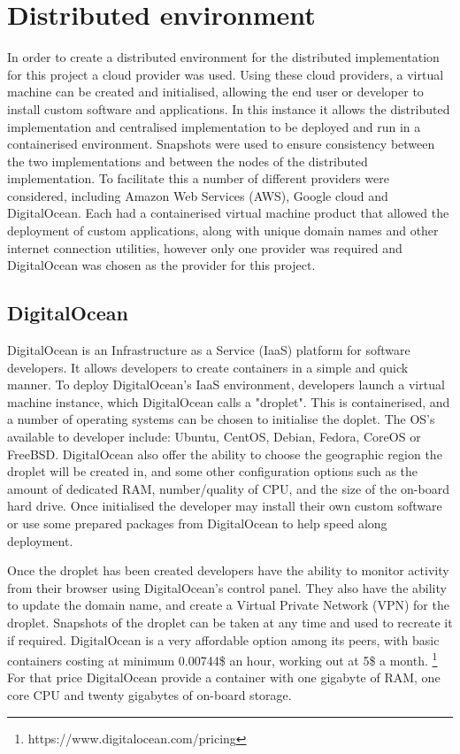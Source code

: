 \documentclass[oneside,12pt]{book}
\begin{document}
\section{Distributed environment}
In order to create a distributed environment for the distributed implementation for this project a cloud provider was used. Using these cloud providers, a virtual machine can be created and initialised, allowing the end user or developer to install custom software and applications. In this instance it allows the distributed implementation and centralised implementation to be deployed and run in a containerised environment. Snapshots were used to ensure consistency between the two implementations and between the nodes of the distributed implementation. To facilitate this a number of different providers were considered, including Amazon Web Services (AWS), Google cloud and DigitalOcean. Each had a containerised virtual machine product that allowed the deployment of custom applications, along with unique domain names and other internet connection utilities, however only one provider was required and DigitalOcean was chosen as the provider for this project. 

\subsection{DigitalOcean}
DigitalOcean is an Infrastructure as a Service (IaaS) platform for software developers. It allows developers to create containers in a simple and quick manner. To deploy DigitalOcean's IaaS environment, developers launch a virtual machine instance, which DigitalOcean calls a "droplet". This is containerised, and a number of operating systems can be chosen to initialise the doplet. The OS's available to developer include: Ubuntu, CentOS, Debian, Fedora, CoreOS or FreeBSD. DigitalOcean also offer the ability to choose the geographic region the droplet will be created in, and some other configuration options such as the amount of dedicated RAM, number/quality of CPU, and the size of the on-board hard drive. Once initialised the developer may install their own custom software or use some prepared packages from DigitalOcean to help speed along deployment. 

Once the droplet has been created developers have the ability to monitor activity from their browser using DigitalOcean's control panel. They also have the ability to update the domain name, and create a Virtual Private Network (VPN) for the droplet. Snapshots of the droplet can be taken at any time and used to recreate it if required. DigitalOcean is a very affordable option among its peers, with basic containers costing at minimum 0.00744\$ an hour, working out at 5\$ a month. \footnote{https://www.digitalocean.com/pricing} For that price DigitalOcean provide a container with one gigabyte of RAM, one core CPU and twenty gigabytes of on-board storage.
\end{document}
